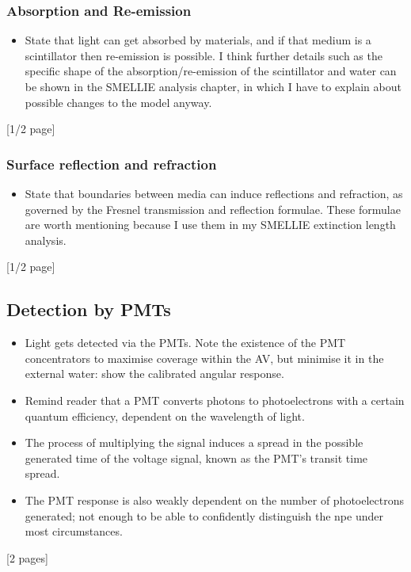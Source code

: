 {    \subsubsection{Absorption and Re-emission}
    \begin{itemize}
        \item State that light can get absorbed by materials, and if that medium is a scintillator then re-emission is possible. I think further details such as the specific shape of the absorption/re-emission of the scintillator and water can be shown in the SMELLIE analysis chapter, in which I have to explain about possible changes to the model anyway.
    \end{itemize}
    [1/2 page]
    \subsubsection{Surface reflection and refraction}
    \begin{itemize}
        \item State that boundaries between media can induce reflections and refraction, as governed by the Fresnel transmission and reflection formulae. These formulae are worth mentioning because I use them in my SMELLIE extinction length analysis.
    \end{itemize}
    [1/2 page]
    \subsection{Detection by PMTs}
    \begin{itemize}
        \item Light gets detected via the PMTs. Note the existence of the PMT concentrators to maximise coverage within the AV, but minimise it in the external water: show the calibrated angular response.
        \item Remind reader that a PMT converts photons to photoelectrons with a certain quantum efficiency, dependent on the wavelength of light.
        \item The process of multiplying the signal induces a spread in the possible generated time of the voltage signal, known as the PMT's transit time spread.
        \item The PMT response is also weakly dependent on the number of photoelectrons generated; not enough to be able to confidently distinguish the npe under most circumstances.
    \end{itemize}
    [2 pages]
}
